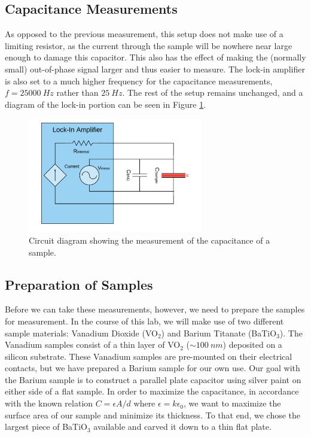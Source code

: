 \documentclass[%
 reprint,
 amsmath,amssymb,
 aps,
 pra,
]{revtex4-1}
\begin{document}
\subsection{Capacitance Measurements}\label{cmeas}

As opposed to the previous measurement, this setup does not make use of a limiting resistor, as the current through the sample will be nowhere near large enough to damage this capacitor. This also has the effect of making the (normally small) out-of-phase signal larger and thus easier to measure. The lock-in amplifier is also set to a much higher frequency for the capacitance measurements, $f = 25000~Hz$ rather than $25~Hz$. The rest of the setup remains unchanged, and a diagram of the lock-in portion can be seen in Figure \ref{fig:CapMeasurements}.

\begin{figure}[H]
	\centering
	\includegraphics[height=5cm]{diagram_cap.png}
	\caption{Circuit diagram showing the measurement of the capacitance of a sample.}
	\label{fig:CapMeasurements}
\end{figure}

\subsection{Preparation of Samples}

Before we can take these measurements, however, we need to prepare the samples for measurement. In the course of this lab, we will make use of two different sample materials: Vanadium Dioxide (VO$_2$) and Barium Titanate (BaTiO$_3$). The Vanadium samples consist of a thin layer of VO$_2$ ($\sim 100~nm$) deposited on a silicon substrate. These Vanadium samples are pre-mounted on their electrical contacts, but we have prepared a Barium sample for our own use. Our goal with the Barium sample is to construct a parallel plate capacitor using silver paint on either side of a flat sample. In order to maximize the capacitance, in accordance with the known relation $C = \epsilon A/d$ where $\epsilon = k \epsilon_0$, we want to maximize the surface area of our sample and minimize its thickness. To that end, we chose the largest piece of BaTiO$_3$ available and carved it down to a thin flat plate.
\end{document}
